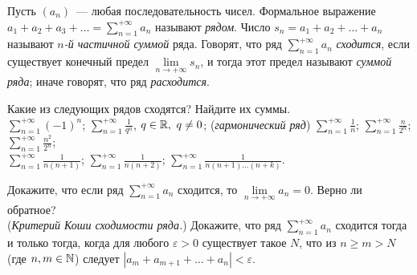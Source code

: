 \documentclass[a4paper, 12pt]{article}
\begin{document}


\noindent

Пусть $(a_n)$~--- любая последовательность чисел.
Формальное выражение\break
$a_1+a_2+a_3+\ldots=\sum\limits_{n=1}^{+\infty} a_n$
называют {\em рядом}.
Число $s_n=a_1+a_2+\dots+a_n$ называют {\em  $n$-й частичной
суммой} ряда.
Говорят, что ряд $\sum\limits_{n=1}^{+\infty} a_n$
{\em сходится}, если
существует конечный предел $\lim\limits_{n\to{+\infty}}s_n$, и тогда этот предел называют {\em суммой ряда};
иначе говорят, что ряд {\em расходится}.


Какие из следующих рядов сходятся? Найдите их суммы.\\
$\sum\limits_{n=1}^{+\infty} (-1)^n$;
$\sum\limits_{n=1}^{+\infty} \frac1{q^n}$, $q\in\mathbb{R},\ q\ne0$;
({\em гармонический ряд})
$\sum\limits_{n=1}^{+\infty} \frac1n$;
$\sum\limits_{n=1}^{+\infty} \frac{n}{2^n}$;
$\sum\limits_{n=1}^{+\infty} \frac{n^2}{2^n}$;\\
$\sum\limits_{n=1}^{+\infty} \frac1{n(n+1)}$;
$\sum\limits_{n=1}^{+\infty} \frac1{n(n+2)}$;
$\sum\limits_{n=1}^{+\infty} \frac1{n(n+1)\dots(n+k)}$.

Докажите, что если ряд $\sum\limits_{n=1}^{+\infty} a_n$ сходится,
то $\lim\limits_{n\to{+\infty}}a_n=0$.  Верно ли обратное?\\
({\em Критерий Коши сходимости ряда.})
Докажите, что ряд $\sum\limits_{n=1}^{+\infty} a_n$ сходится тогда и только
тогда, когда для любого $\varepsilon>0$ существует такое $N$, что
из $n\geqslant m>N$
(где $n,m\in\mathbb{N}$) следует $|a_m+a_{m+1}+\dots+a_n|<\varepsilon$.
\end{document}
